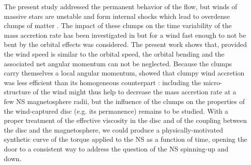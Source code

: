 \documentclass{aa}
\makeatletter
\newcommand{\sgx}{SgXB\xspace}
\newcommand*{\hmxb}{HMXB\@\xspace}
\newcommand*{\ns}{NS\@\xspace}
\newcommand*{\eg}{e.g.\@\xspace}
\newcommand*{\ie}{i.e.\@\xspace}
\makeatother
\begin{document}
The present study addressed the permanent behavior of the flow, but winds of massive stars are unstable and form internal shocks which lead to overdense clumps of matter \citep{Owocki1984,Sundqvist2017}. The impact of these clumps on the time variability of the mass accretion rate has been investigated in \cite{ElMellah} but for a wind fast enough to not be bent by the orbital effects was considered. The present work shows that, provided the wind speed is similar to the orbital speed, the orbital bending and the associated net angular momentum can not be neglected. Because the clumps carry themselves a local angular momentum, \cite{ElMellah} showed that clumpy wind accretion was less efficient than its homogeneous counterpart : including the micro-structure of the wind might thus help to decrease the mass accretion rate at a few \ns magnetosphere radii, but the influence of the clumps on the properties of the wind-captured disc (\eg its permanence) remains to be studied. With a proper treatment of the effective viscosity in the disc and of the coupling between the disc and the magnetosphere, we could produce a physically-motivated synthetic curve of the torque applied to the \ns as a function of time, opening the door to a consistent way to address the question of the \ns spinning-up and down.




\end{document}
